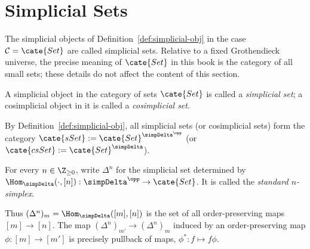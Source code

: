 
\section{Simplicial Sets}\label{sec:simplicial-set}
\hypertarget{o014.aljabr2.chapter8.simplicial-sets}{ }
The simplicial objects of Definition~\ref{def:simplicial-obj} in the case
$\mathcal{C}=\cate{Set}$ are called simplicial sets. Relative to a fixed
Grothendieck universe, the precise meaning of $\cate{Set}$ in this book is the
category of all small sets; these details do not affect the content of this
section.

\begin{definition}
	A simplicial object in the category of sets $\cate{Set}$ is called a
	\emph{simplicial set}; a cosimplicial object in it is called a
	\emph{cosimplicial set}.
\end{definition}

By Definition~\ref{def:simplicial-obj}, all simplicial sets (or cosimplicial
sets) form the category
$\cate{sSet}:=\cate{Set}^{\simpDelta^{\opp}}$ (or
$\cate{csSet}:=\cate{Set}^{\simpDelta}$).

\begin{definition}\label{def:standard-simplicial-set}
	For every $n\in\Z_{\geq0}$, write $\Delta^n$ for the simplicial set
	determined by
	$\Hom_{\simpDelta}(\mathord\cdot,[n]):
	\simpDelta^{\opp}\to\cate{Set}$. It is called the \emph{standard
	$n$-simplex}.
\end{definition}

Thus $(\Delta^n)_m=\Hom_{\simpDelta}([m],[n])$ is the set of all
order-preserving maps $[m]\to[n]$. The map
$(\Delta^n)_{m'}\to(\Delta^n)_m$ induced by an order-preserving map
$\phi:[m]\to[m']$ is precisely pullback of maps,
$\phi^*:f\mapsto f\phi$.

